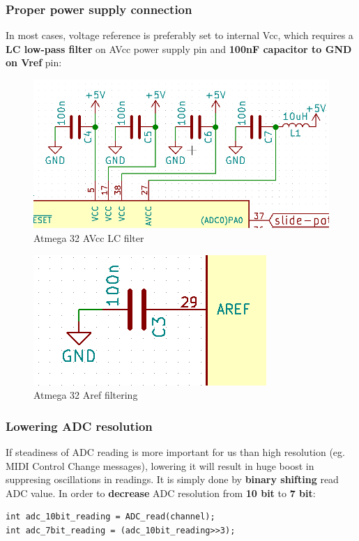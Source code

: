 \documentclass{article}
\begin{document}
\subsubsection{Proper power supply connection}
In most cases, voltage reference is preferably set to internal Vcc, which requires a \textbf{LC low-pass filter} on AVcc power supply pin and \textbf{100nF capacitor to GND on Vref} pin:
\begin{figure}[H]
	\center
	\includegraphics[scale=0.3]{img/atmega-avcc.png}
	\caption{Atmega 32 AVcc LC filter}
\end{figure}
\begin{figure}[H]
	\center
	\includegraphics[scale=0.4]{img/atmega-vref.png}
	\caption{Atmega 32 Aref filtering}
\end{figure}

\subsubsection{Lowering ADC resolution}
If steadiness of ADC reading is more important for us than high resolution (eg. MIDI Control Change messages), lowering it will result in huge boost in suppresing oscillations in readings. It is simply done by \textbf{binary shifting} read ADC value. In order to \textbf{decrease} ADC resolution from \textbf{10 bit} to \textbf{7 bit}:
%
\begin{verbatim}
int adc_10bit_reading = ADC_read(channel);
int adc_7bit_reading = (adc_10bit_reading>>3);
\end{verbatim}
\end{document}
